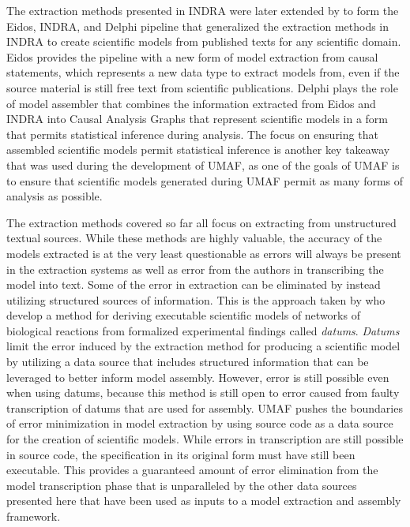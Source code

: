 The extraction methods presented in INDRA were later extended by \citet{EidosIndraDelphi} to form the Eidos, INDRA, and Delphi pipeline that generalized the extraction methods in INDRA to create scientific models from published texts for any scientific domain.
Eidos provides the pipeline with a new form of model extraction from causal statements, which represents a new data type to extract models from, even if the source material is still free text from scientific publications.
Delphi plays the role of model assembler that combines the information extracted from Eidos and INDRA into Causal Analysis Graphs that represent scientific models in a form that permits statistical inference during analysis.
The focus on ensuring that assembled scientific models permit statistical inference is another key takeaway that was used during the development of UMAF, as one of the goals of UMAF is to ensure that scientific models generated during UMAF permit as many forms of analysis as possible.

The extraction methods covered so far all focus on extracting from unstructured textual sources.
While these methods are highly valuable, the accuracy of the models extracted is at the very least questionable as errors will always be present in the extraction systems as well as error from the authors in transcribing the model into text.
Some of the error in extraction can be eliminated by instead utilizing structured sources of information.
This is the approach taken by \citet{nigam2015datums} who develop a method for deriving executable scientific models of networks of biological reactions from formalized experimental findings called \textit{datums}.
\textit{Datums} limit the error induced by the extraction method for producing a scientific model by utilizing a data source that includes structured information that can be leveraged to better inform model assembly.
However, error is still possible even when using datums, because this method is still open to error caused from faulty transcription of datums that are used for assembly.
UMAF pushes the boundaries of error minimization in model extraction by using source code as a data source for the creation of scientific models.
While errors in transcription are still possible in source code, the specification in its original form must have still been executable.
This provides a guaranteed amount of error elimination from the model transcription phase that is unparalleled by the other data sources presented here that have been used as inputs to a model extraction and assembly framework.
